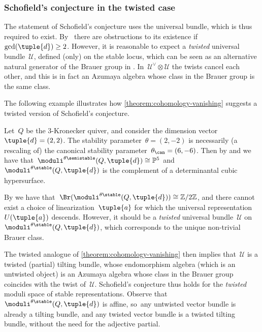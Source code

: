 \subsubsection*{Schofield's conjecture in the twisted case}
The statement of Schofield's conjecture uses the universal bundle,
which is thus required to exist. By~\cite[Th.\,4.4]{MR3683503} there are obstructions to its existence
if~$\gcd(\tuple{d})\geq 2$.
However, it is reasonable to expect a \emph{twisted} universal bundle~$\mathcal{U}$,
defined (only) on the stable locus,
which can be seen as an alternative natural generator of the Brauer group in \cite[Conj.\,4.3]{MR3683503}.
In~$\mathcal{U}^\vee\otimes\mathcal{U}$ the twists cancel each other,
and this is in fact an Azumaya algebra whose class in the Brauer group is the same class.

The following example illustrates how \cref{theorem:cohomology-vanishing}
suggests a twisted version of Schofield's conjecture.

\begin{example}
\label{example:twisted-schofield}
Let~$Q$ be the $3$-Kronecker quiver,
and consider the dimension vector~$\tuple{d}=(2,2)$.
The stability parameter~$\theta=(2,-2)$ is necessarily
(a rescaling of) the canonical stability parameter~$\theta_\can=(6,-6)$.
Then by \cite[p.\,1779]{MR1972892}
and \cite[\S7]{MR3683503} we have that~$\moduli^{\theta\semistable}(Q,\tuple{d})\cong\mathbb{P}^5$
and~$\moduli^{\theta\stable}(Q,\tuple{d})$ is the complement of a determinantal cubic hypersurface.

By \cite[Prop.\,7.1]{MR3683503} we have that~$\Br(\moduli^{\theta\stable}(Q,\tuple{d}))\cong\mathbb{Z}/2\mathbb{Z}$,
and there cannot exist a choice of linearization~$\tuple{a}$
for which the universal representation~$U(\tuple{a})$ descends.
However, it should be a \emph{twisted} universal bundle~$\mathcal{U}$ on~$\moduli^{\theta\stable}(Q,\tuple{d})$,
which corresponds to the unique non-trivial Brauer class.

The twisted analogue of \cref{theorem:cohomology-vanishing}
then implies that~$\mathcal{U}$ is a twisted (partial) tilting bundle,
whose endomorphism algebra (which is an untwisted object)
is an Azumaya algebra whose class in the Brauer group coincides with the twist of~$\mathcal{U}$.
Schofield's conjecture thus holds for the \emph{twisted} moduli space of stable representations.
Observe that~$\moduli^{\theta\stable}(Q,\tuple{d})$ is affine, so~any untwisted vector bundle is already a tilting bundle,
and any twisted vector bundle is a twisted tilting bundle,
without the need for the adjective partial.
\end{example}

